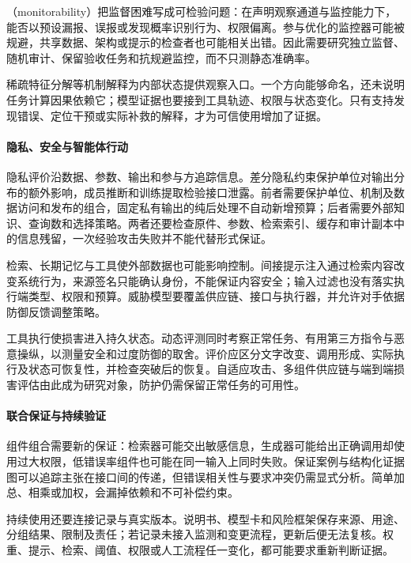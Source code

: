 （monitorability）把监督困难写成可检验问题：在声明观察通道与监控能力下，能否以预设漏报、误报或发现概率识别行为、权限偏离。参与优化的监控器可能被规避，共享数据、架构或提示的检查者也可能相关出错。因此需要研究独立监督、随机审计、保留验收任务和抗规避监控，而不只测静态准确率。

稀疏特征分解等机制解释为内部状态提供观察入口。一个方向能够命名，还未说明任务计算因果依赖它；模型证据也要接到工具轨迹、权限与状态变化。只有支持发现错误、定位干预或实际补救的解释，才为可信使用增加了证据。

\paragraph{隐私、安全与智能体行动}

隐私评价沿数据、参数、输出和参与方追踪信息。差分隐私约束保护单位对输出分布的额外影响，成员推断和训练提取检验接口泄露。前者需要保护单位、机制及数据访问和发布的组合，固定私有输出的纯后处理不自动新增预算；后者需要外部知识、查询数和选择策略。两者还要检查原件、参数、检索索引、缓存和审计副本中的信息残留，一次经验攻击失败并不能代替形式保证。

检索、长期记忆与工具使外部数据也可能影响控制。间接提示注入通过检索内容改变系统行为，来源签名只能确认身份，不能保证内容安全；输入过滤也没有落实执行端类型、权限和预算。威胁模型要覆盖供应链、接口与执行器，并允许对手依据防御反馈调整策略。

工具执行使损害进入持久状态。动态评测同时考察正常任务、有用第三方指令与恶意操纵，以测量安全和过度防御的取舍。评价应区分文字改变、调用形成、实际执行及状态可恢复性，并检查突破后的恢复。自适应攻击、多组件供应链与端到端损害评估由此成为研究对象，防护仍需保留正常任务的可用性。

\paragraph{联合保证与持续验证}

组件组合需要新的保证：检索器可能交出敏感信息，生成器可能给出正确调用却使用过大权限，低错误率组件也可能在同一输入上同时失败。保证案例与结构化证据图可以追踪主张在接口间的传递，但错误相关性与要求冲突仍需显式分析。简单加总、相乘或加权，会漏掉依赖和不可补偿约束。

持续使用还要连接记录与真实版本。说明书、模型卡和风险框架保存来源、用途、分组结果、限制及责任；若记录未接入监测和变更流程，更新后便无法复核。权重、提示、检索、阈值、权限或人工流程任一变化，都可能要求重新判断证据。

